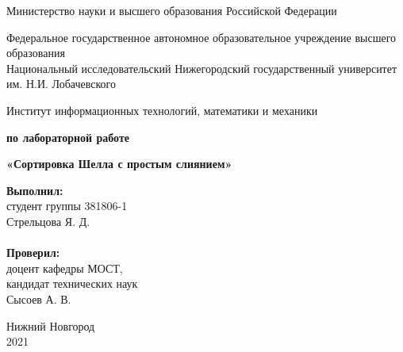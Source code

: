 \documentclass{report}
\begin{document}
\begin{titlepage}

\begin{center}
Министерство науки и высшего образования Российской Федерации
\end{center}

\begin{center}
Федеральное государственное автономное образовательное учреждение высшего образования \\
Национальный исследовательский Нижегородский государственный университет им. Н.И. Лобачевского
\end{center}

\begin{center}
Институт информационных технологий, математики и механики
\end{center}

\vspace{4em}

\begin{center}
\textbf{ по лабораторной работе} \\
\end{center}
\begin{center}
\textbf{\Large«Сортировка Шелла с простым слиянием»} \\
\end{center}

\vspace{4em}

\newbox{\lbox}
\newlength{\maxl}
\setlength{\maxl}{\wd\lbox}
\hfill\parbox{7cm}{
\hspace*{5cm}\hspace*{-5cm}\textbf{Выполнил:} \\ студент группы 381806-1 \\ Стрельцова Я. Д.\\
\\
\hspace*{5cm}\hspace*{-5cm}\textbf{Проверил:}\\ доцент кафедры МОСТ, \\ кандидат технических наук \\ Сысоев А. В.\\
}
\vspace{\fill}

\begin{center} Нижний Новгород \\ 2021 \end{center}

\end{titlepage}
\end{document}
